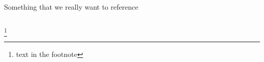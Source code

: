 \documentclass{beamer}
\newcommand\blfootnote[1]{%
  \begingroup
  \renewcommand\thefootnote{}\footnote{#1}%
  \addtocounter{footnote}{-1}%
  \endgroup
}
\begin{document}
\begin{frame}
\begin{columns}
Something that we really want to reference
\end{columns}
\blfootnote{text in the footnote}
\end{frame}
\end{document}
